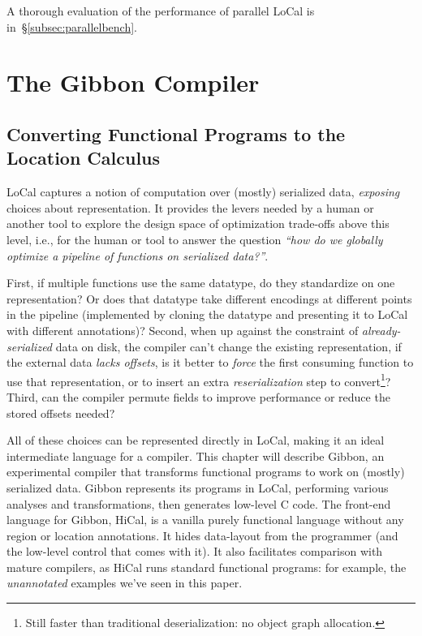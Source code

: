 \documentclass[showabstract,showacknowledgments,showpreface,showdedication,school]{iuphd}
\theoremstyle{nonumberplain}
\newcommand{\sysname}[0]{LoCal\xspace}
\newcommand{\ourcalc}[0]{\sysname}
\newcommand{\lamadt} [0]{HiCal\xspace}
\newcommand{\ie}{{i.e.,}}
\newcommand{\secref}[1]{\S\ref{#1}}
\begin{document}
A thorough evaluation of the performance of parallel \ourcalc{} is
in~\secref{subsec:parallelbench}.


\chapter{The Gibbon Compiler}\label{chapter:gibbon}

\section{Converting Functional Programs to the Location Calculus}\label{sec:infer-local}

\ourcalc{} captures a notion of computation over (mostly) serialized data,
\emph{exposing} choices about representation. It provides the levers needed by a human
or another tool to explore the design space of optimization trade-offs above
this level, \ie{} for the human or tool to answer the question
\emph{``how do we globally optimize a pipeline of functions on serialized data?''}.

First, if multiple functions use the same datatype, do they standardize on one
    representation?  Or does that datatype take different encodings at different
    points in the pipeline (implemented by cloning the datatype and
    presenting it to \ourcalc with different annotations)?
Second, when up against the constraint of {\em already-serialized} data on
    disk, the compiler can't change the existing representation, if the
    external data \emph{lacks offsets}, is it better to \emph{force}
    the first consuming function to use that representation, or to insert an
    extra {\em reserialization} step to convert\footnote{Still faster
    than traditional deserialization: no object graph allocation.}?
Third, can the compiler permute fields to improve performance or reduce the
    stored offsets needed?


    All of these choices can be represented directly in \ourcalc, making it an
    ideal intermediate language for a compiler. This chapter will describe Gibbon,
    an experimental compiler that transforms functional programs to work on
    (mostly) serialized data. Gibbon represents its programs in \ourcalc,
    performing various analyses and transformations, then generates low-level C code.
The front-end language for Gibbon, \lamadt, is a vanilla purely functional
language without any region or location
annotations.  It hides data-layout from the programmer (and the low-level
control that comes with it).  It also facilitates comparison with
mature compilers, as \lamadt runs standard functional programs:
for example, the {\em unannotated} examples we've seen in this paper.
\end{document}
